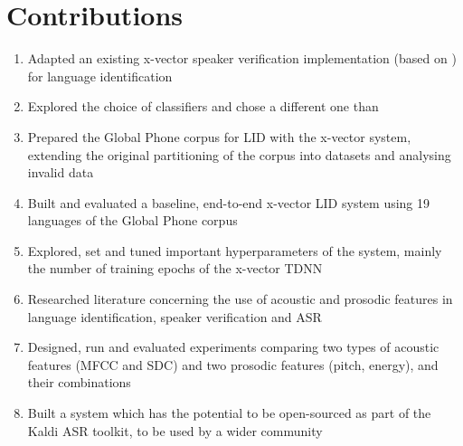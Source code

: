 \documentclass[bsc,frontabs,twoside,singlespacing,parskip,deptreport]{infthesis}
\begin{document}
{  \section{Contributions}{
    \begin{enumerate}
      \item {
        Adapted an existing x-vector speaker verification implementation (based on \cite{Snyder_et_al_2018b}) for language identification
      }
      \item {
        Explored the choice of classifiers and chose a different one than \cite{Snyder_et_al_2018}
      }
      \item {
        Prepared the Global Phone corpus for LID with the x-vector system, extending the original partitioning of the corpus into datasets and analysing invalid data
      }
      \item {
        Built and evaluated a baseline, end-to-end x-vector LID system using 19 languages of the Global Phone corpus
      }
      \item {
        Explored, set and tuned important hyperparameters of the system, mainly the number of training epochs of the x-vector TDNN
      }
      \item {
        Researched literature concerning the use of acoustic and prosodic features in language identification, speaker verification and ASR
      }
      \item {
        Designed, run and evaluated experiments comparing two types of acoustic features (MFCC and SDC) and two prosodic features (pitch, energy), and their combinations
      }
      \item {
        Built a system which has the potential to be open-sourced as part of the Kaldi ASR toolkit, to be used by a wider community
      }
    \end{enumerate}
  }
}
\end{document}
